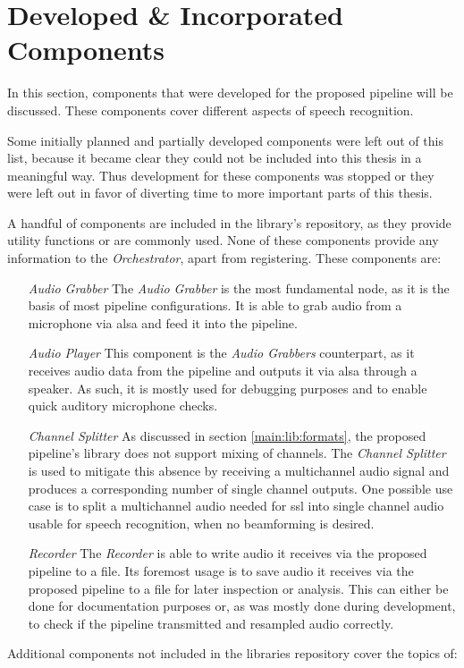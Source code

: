 
\section{Developed \& Incorporated Components}
\label{main:components:start}
In this section, components that were developed for the proposed pipeline will be discussed.
These components cover different aspects of speech recognition.

Some initially planned and partially developed components were left out of this list, because it became clear they could not be included into this thesis in a meaningful way.
Thus development for these components was stopped or they were left out in favor of diverting time to more important parts of this thesis.


A handful of components are included in the library's repository, as they provide utility functions or are commonly used.
None of these components provide any information to the \textit{Orchestrator}, apart from registering.
These components are:
\begin{itemize}[leftmargin=1in]
	\item[\textit{Audio Grabber}] The \textit{Audio Grabber} is the most fundamental node, as it is the basis of most pipeline configurations.
	It is able to grab audio from a microphone via \gls{alsa} and feed it into the pipeline.

	\item[\textit{Audio Player}] This component is the \textit{Audio Grabbers} counterpart, as it receives audio data from the pipeline and outputs it via \gls{alsa} through a speaker.
	As such, it is mostly used for debugging purposes and to enable quick auditory microphone checks.

	\item[\textit{Channel Splitter}] As discussed in section \ref{main:lib:formats}, the proposed pipeline's library does not support mixing of channels.
	The \textit{Channel Splitter} is used to mitigate this absence by receiving a multichannel audio signal and produces a corresponding number of single channel outputs.
	One possible use case is to split a multichannel audio needed for \gls{ssl} into single channel audio usable for speech recognition, when no beamforming is desired.

	\item[\textit{Recorder}] The \textit{Recorder} is able to write audio it receives via the proposed pipeline to a file.
	Its foremost usage is to save audio it receives via the proposed pipeline to a file for later inspection or analysis.
	This can either be done for documentation purposes or, as was mostly done during development, to check if the pipeline transmitted and resampled audio correctly.
\end{itemize}
Additional components not included in the libraries repository cover the topics of:

